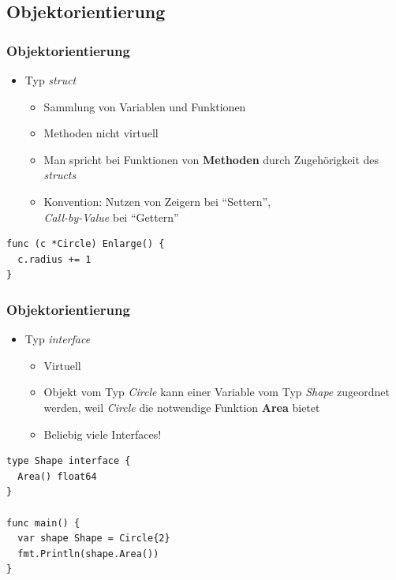 \documentclass{beamer}
\begin{document}
\subsection{Objektorientierung}
\begin{frame}[fragile]
\frametitle{Objektorientierung}

\begin{itemize}
\item Typ \textit{struct}
\begin{itemize}
\setlength{\itemsep}{12pt}
\item Sammlung von Variablen und Funktionen
\item Methoden nicht virtuell
\item Man spricht bei Funktionen von \textbf{Methoden} durch Zugeh\"origkeit des \textit{structs}
\item Konvention: Nutzen von Zeigern bei ``Settern'',\\ \textit{Call-by-Value} bei ``Gettern''
\end{itemize}
\end{itemize}

\begin{lstlisting}
func (c *Circle) Enlarge() {
  c.radius += 1
}
\end{lstlisting}

\end{frame}

\begin{frame}[fragile]
\frametitle{Objektorientierung}

\begin{itemize}
\item Typ \textit{interface}
\begin{itemize}
\setlength{\itemsep}{12pt}
\item Virtuell
\item Objekt vom Typ \textit{Circle} kann einer Variable vom Typ \textit{Shape} zugeordnet werden, weil \textit{Circle} die notwendige Funktion \textbf{Area} bietet
\item Beliebig viele Interfaces!
\end{itemize}
\end{itemize}

\begin{lstlisting}
type Shape interface {
  Area() float64
}

func main() {
  var shape Shape = Circle{2}
  fmt.Println(shape.Area())
}
\end{lstlisting}

\end{frame}
\end{document}
